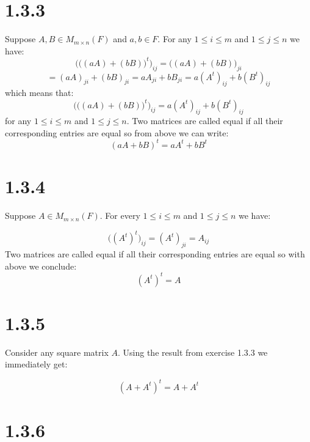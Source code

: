 \documentclass{article}
\begin{document}
\section*{1.3.3}

Suppose \(A, B \in M_{m \times n}(F)\) and \(a, b \in F\).
For any \(1 \leq i \leq m\) and \(1 \leq j \leq n\) we have:
\begin{equation*}
    \Bigg(\Big((aA) + (bB)\Big)^{t}\Bigg)_{ij} = \Big((aA) + (bB)\Big)_{ji}
\end{equation*}
\begin{equation*}
    = (aA)_{ji} + (bB)_{ji} = aA_{ji} + bB_{ji} = a(A^{t})_{ij} + b(B^{t})_{ij}
\end{equation*}
which means that:
\begin{equation*}
    \Bigg(\Big((aA) + (bB)\Big)^{t}\Bigg)_{ij} = a(A^{t})_{ij} + b(B^{t})_{ij}
\end{equation*}
for any \(1 \leq i \leq m\) and \(1 \leq j \leq n\).
Two matrices are called equal if all their corresponding entries are equal so from above we can write:
\begin{equation*}
    (aA + bB)^{t} = aA^{t} + bB^{t}
\end{equation*}

\section*{1.3.4}
Suppose \(A \in M_{m \times n}(F)\). For every \(1 \leq i \leq m\) and \(1 \leq j \leq n\) we have:

\begin{equation*}
    \Big((A^{t})^{t}\Big)_{ij} = (A^{t})_{ji} = A_{ij}
\end{equation*}
Two matrices are called equal if all their corresponding entries are equal so with above we conclude:
\begin{equation*}
    (A^{t})^{t} = A
\end{equation*}

\section*{1.3.5}

Consider any square matrix \(A\). Using the result from exercise 1.3.3 we immediately get:

\begin{equation*}
    (A + A^{t})^{t} = A + A^{t}
\end{equation*}

\section*{1.3.6}
\end{document}
